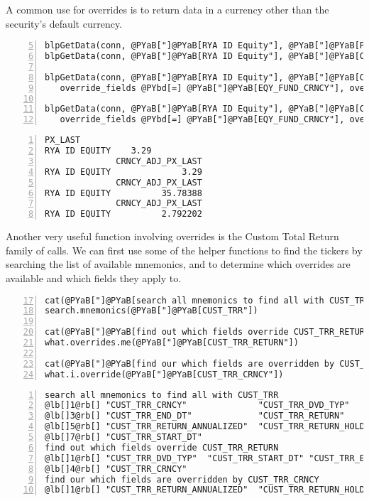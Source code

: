 \documentclass[a4paper]{article}
\begin{document}
A common use for overrides is to return data in a currency other than the security's default currency.

\begin{Verbatim}[commandchars=@\[\],numbers=left,firstnumber=5,stepnumber=1]
blpGetData(conn, @PYaB["]@PYaB[RYA ID Equity"], @PYaB["]@PYaB[PX_LAST"])
blpGetData(conn, @PYaB["]@PYaB[RYA ID Equity"], @PYaB["]@PYaB[CRNCY_ADJ_PX_LAST"])

blpGetData(conn, @PYaB["]@PYaB[RYA ID Equity"], @PYaB["]@PYaB[CRNCY_ADJ_PX_LAST"], 
   override_fields @PYbd[=] @PYaB["]@PYaB[EQY_FUND_CRNCY"], overrides @PYbd[=] @PYaB["]@PYaB[HKD"])

blpGetData(conn, @PYaB["]@PYaB[RYA ID Equity"], @PYaB["]@PYaB[CRNCY_ADJ_PX_LAST"], 
   override_fields @PYbd[=] @PYaB["]@PYaB[EQY_FUND_CRNCY"], overrides @PYbd[=] @PYaB["]@PYaB[GBP"])
\end{Verbatim}

    

\begin{Verbatim}[commandchars=@\[\],numbers=left,firstnumber=1,stepnumber=1]
              PX_LAST
RYA ID EQUITY    3.29
              CRNCY_ADJ_PX_LAST
RYA ID EQUITY              3.29
              CRNCY_ADJ_PX_LAST
RYA ID EQUITY          35.78388
              CRNCY_ADJ_PX_LAST
RYA ID EQUITY          2.792202
\end{Verbatim}

    

Another very useful function involving overrides is the Custom Total Return family of calls. We can first use some of the helper functions to find the tickers by searching the list of available mnemonics, and to determine which overrides are available and which fields they apply to.

\begin{Verbatim}[commandchars=@\[\],numbers=left,firstnumber=17,stepnumber=1]
cat(@PYaB["]@PYaB[search all mnemonics to find all with CUST_TRR\n"])
search.mnemonics(@PYaB["]@PYaB[CUST_TRR"])

cat(@PYaB["]@PYaB[find out which fields override CUST_TRR_RETURN\n"])
what.overrides.me(@PYaB["]@PYaB[CUST_TRR_RETURN"])

cat(@PYaB["]@PYaB[find our which fields are overridden by CUST_TRR_CRNCY\n"])
what.i.override(@PYaB["]@PYaB[CUST_TRR_CRNCY"])
\end{Verbatim}

    

\begin{Verbatim}[commandchars=@\[\],numbers=left,firstnumber=1,stepnumber=1]
search all mnemonics to find all with CUST_TRR
@lb[]1@rb[] "CUST_TRR_CRNCY"              "CUST_TRR_DVD_TYP"           
@lb[]3@rb[] "CUST_TRR_END_DT"             "CUST_TRR_RETURN"            
@lb[]5@rb[] "CUST_TRR_RETURN_ANNUALIZED"  "CUST_TRR_RETURN_HOLDING_PER"
@lb[]7@rb[] "CUST_TRR_START_DT"          
find out which fields override CUST_TRR_RETURN
@lb[]1@rb[] "CUST_TRR_DVD_TYP"  "CUST_TRR_START_DT" "CUST_TRR_END_DT"  
@lb[]4@rb[] "CUST_TRR_CRNCY"   
find our which fields are overridden by CUST_TRR_CRNCY
@lb[]1@rb[] "CUST_TRR_RETURN_ANNUALIZED"  "CUST_TRR_RETURN_HOLDING_PER"
\end{Verbatim}
\end{document}
